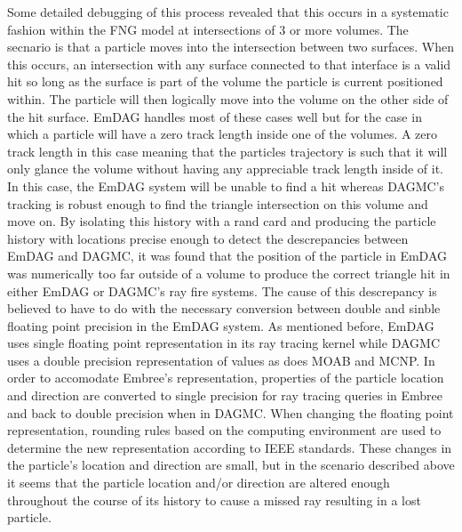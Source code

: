 \documentclass[12pt, a4paper]{article}
\begin{document}
Some detailed debugging of this process revealed that this occurs in a systematic fashion within the FNG model at intersections of 3 or more volumes. The secnario is that a particle moves into the intersection between two surfaces. When this occurs, an intersection with any surface connected to that interface is a valid hit so long as the surface is part of the volume the particle is current positioned within. The particle will then logically move into the volume on the other side of the hit surface. EmDAG handles most of these cases well but for the case in which a particle will have a zero track length inside one of the volumes. A zero track length in this case meaning that the particles trajectory is such that it will only glance the volume without having any appreciable track length inside of it. In this case, the EmDAG system will be unable to find a hit whereas DAGMC's tracking is robust enough to find the triangle intersection on this volume and move on. By isolating this history with a rand card and producing the particle history with locations precise enough to detect the descrepancies between EmDAG and DAGMC, it was found that the position of the particle in EmDAG was numerically too far outside of a volume to produce the correct triangle hit in either EmDAG or DAGMC's ray fire systems. The cause of this descrepancy is believed to have to do with the necessary conversion between double and sinble floating point precision in the EmDAG system. As mentioned before, EmDAG uses single floating point representation in its ray tracing kernel while DAGMC uses a double precision representation of values as does MOAB and MCNP. In order to accomodate Embree's representation, properties of the particle location and direction are converted to single precision for ray tracing queries in Embree and back to double precision when in DAGMC. When changing the floating point representation, rounding rules based on the computing environment are used to determine the new representation according to IEEE standards. \cite{IEEE754_2008} These changes in the particle's location and direction are small, but in the scenario described above it seems that the particle location and/or direction are altered enough throughout the course of its history to cause a missed ray resulting in a lost particle.
\end{document}
